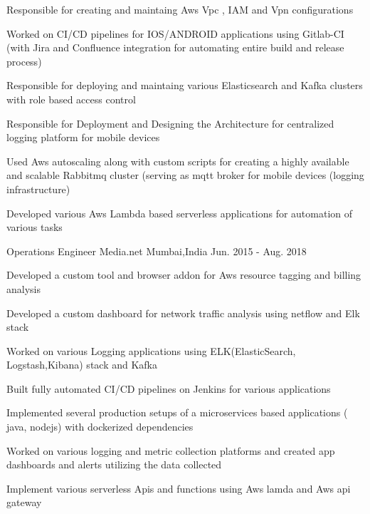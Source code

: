 \begin{cventries}
    {
      \begin{cvitems} %
	    \item { Responsible for creating and maintaing Aws Vpc , IAM and Vpn configurations}
		\item {Worked on CI/CD pipelines for IOS/ANDROID applications using Gitlab-CI (with Jira and Confluence integration for automating entire build and release process)}
		\item {Responsible for deploying and maintaing various Elasticsearch and Kafka clusters with role based access control }
		\item  { Responsible for Deployment and Designing the  Architecture for centralized logging platform for mobile devices}
		\item { Used Aws autoscaling along with custom scripts  for creating  a highly available and scalable   Rabbitmq cluster (serving as mqtt broker for mobile devices (logging infrastructure) }
		\item {Developed various  Aws Lambda based serverless applications for automation of various tasks }                   
	  \end{cvitems}
    }

  \cventry
    {Operations Engineer} %
    {Media.net} %
    {Mumbai,India} %
    {Jun. 2015 - Aug. 2018} %
    {
      \begin{cvitems} %
	    \item {Developed a custom tool and browser addon for Aws resource tagging and billing analysis }
		\item {Developed a custom dashboard for network traffic analysis using netflow and Elk stack }
        \item {Worked on various Logging applications using ELK(ElasticSearch, Logstash,Kibana) stack and Kafka}
        \item {Built fully automated CI/CD pipelines on Jenkins for various applications}
        \item {Implemented several production setups of a microservices based applications ( java, nodejs) with dockerized dependencies}
        \item {Worked on various logging and metric collection platforms and created app dashboards and alerts utilizing the data collected}
		\item {Implement various serverless Apis and functions using Aws lamda and Aws api gateway}
      \end{cvitems}
    }

\end{cventries}
